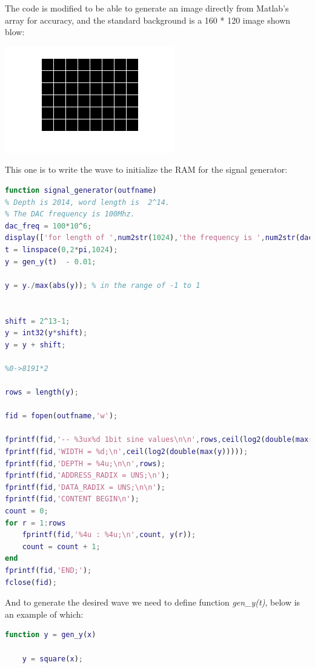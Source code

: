 \documentclass[11pt]{scrartcl}
\begin{document}
The code is modified to be able to generate an image directly from Matlab's array for accuracy, and the standard background is a 160 * 120 image shown blow:
\begin{center}
\begin{minipage}[t]{\linewidth}

{
\includegraphics[scale = 1]{temp.png}
}
\end{minipage}
\medskip
\end{center}

This one is to write the wave to initialize the RAM for the signal generator:
\begin{lstlisting}[language=Matlab]
function signal_generator(outfname)
% Depth is 2014, word length is  2^14.
% The DAC frequency is 100Mhz.
dac_freq = 100*10^6;
display(['for length of ',num2str(1024),'the frequency is ',num2str(dac_freq/1024)])
t = linspace(0,2*pi,1024);
y = gen_y(t)  - 0.01;

y = y./max(abs(y)); % in the range of -1 to 1


shift = 2^13-1;
y = int32(y*shift);
y = y + shift;

%0->8191*2

rows = length(y);

fid = fopen(outfname,'w');

fprintf(fid,'-- %3ux%d 1bit sine values\n\n',rows,ceil(log2(double(max(y)))));
fprintf(fid,'WIDTH = %d;\n',ceil(log2(double(max(y)))));
fprintf(fid,'DEPTH = %4u;\n\n',rows);
fprintf(fid,'ADDRESS_RADIX = UNS;\n');
fprintf(fid,'DATA_RADIX = UNS;\n\n');
fprintf(fid,'CONTENT BEGIN\n');
count = 0;
for r = 1:rows
    fprintf(fid,'%4u : %4u;\n',count, y(r));
    count = count + 1;
end
fprintf(fid,'END;');
fclose(fid);
\end{lstlisting}

And to generate the desired wave we need to define function \textit{gen\_y(t)}, below is an example of which:

\begin{lstlisting}[language=Matlab]
function y = gen_y(x)

    y = square(x);
\end{lstlisting}
\end{document}
